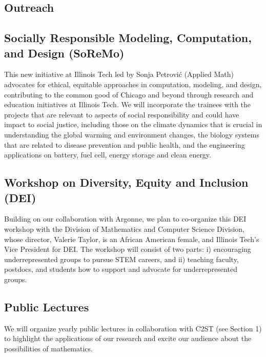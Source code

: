 \documentclass[11pt]{NSFamsart}
\begin{document}
 
\subsection{Outreach}
\subsection*{Socially Responsible Modeling, Computation, and Design
(SoReMo)}
This new initiative at Illinois Tech led by Sonja Petrovi\'c (Applied Math) advocates for ethical, equitable approaches in computation,
modeling, and design, contributing to the common good of Chicago and
beyond through research and education initiatives at Illinois Tech.
 We will incorporate the trainees with the projects that are relevant to aspects of social responsibility and could have impact to social justice, including those on the climate dynamics that is crucial in understanding the global warming and environment changes, the biology systems that are related to disease prevention and public health,  and the engineering applications on battery, fuel cell, energy storage and clean energy.


\subsection*{Workshop on Diversity, Equity and Inclusion (DEI)}
Building on our collaboration with Argonne, we plan to co-organize this DEI workshop with the Division of Mathematics and Computer Science Division, whose director, Valerie Taylor, is an African American female, and Illinois Tech's  Vice President for DEI.  The workshop will consist of two parts: i) encouraging underrepresented groups to pursue STEM careers, and ii) teaching faculty, postdocs, and students how to support and advocate for underrepresented groups.

\subsection*{Public Lectures} We will organize yearly public lectures in collaboration with  C2ST (see Section 1) to highlight the applications of   our research and excite our audience about the possibilities of mathematics.  
\end{document}
